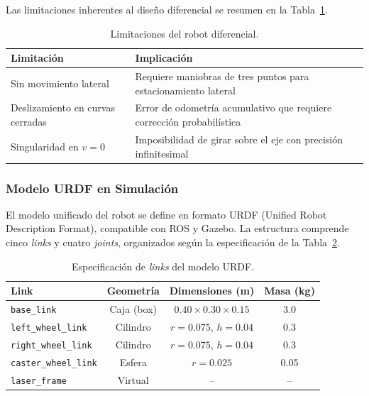 \documentclass[12pt,letterpaper]{article}
\begin{document}
Las limitaciones inherentes al diseño diferencial se resumen en la Tabla~\ref{tab:limitaciones}.

\begin{table}[H]
    \centering
    \caption{Limitaciones del robot diferencial.}
    \label{tab:limitaciones}
    \begin{tabular}{lp{8cm}}
        \hline
        \textbf{Limitación} & \textbf{Implicación} \\
        \hline
        Sin movimiento lateral & Requiere maniobras de tres puntos para estacionamiento lateral \\
        Deslizamiento en curvas cerradas & Error de odometría acumulativo que requiere corrección probabilística \\
        Singularidad en $v = 0$ & Imposibilidad de girar sobre el eje con precisión infinitesimal \\
        \hline
    \end{tabular}
\end{table}

\subsubsection{Modelo URDF en Simulación}
\label{sec:urdf}

El modelo unificado del robot se define en formato URDF (Unified Robot Description Format), compatible con ROS y Gazebo. La estructura comprende cinco \textit{links} y cuatro \textit{joints}, organizados según la especificación de la Tabla~\ref{tab:links}.

\begin{table}[H]
    \centering
    \caption{Especificación de \textit{links} del modelo URDF.}
    \label{tab:links}
    \begin{tabular}{lccc}
        \hline
        \textbf{Link} & \textbf{Geometría} & \textbf{Dimensiones (m)} & \textbf{Masa (kg)} \\
        \hline
        \texttt{base\_link} & Caja (box) & $0.40 \times 0.30 \times 0.15$ & 3.0 \\
        \texttt{left\_wheel\_link} & Cilindro & $r=0.075$, $h=0.04$ & 0.3 \\
        \texttt{right\_wheel\_link} & Cilindro & $r=0.075$, $h=0.04$ & 0.3 \\
        \texttt{caster\_wheel\_link} & Esfera & $r=0.025$ & 0.05 \\
        \texttt{laser\_frame} & Virtual & -- & -- \\
        \hline
    \end{tabular}
\end{table}
\end{document}

